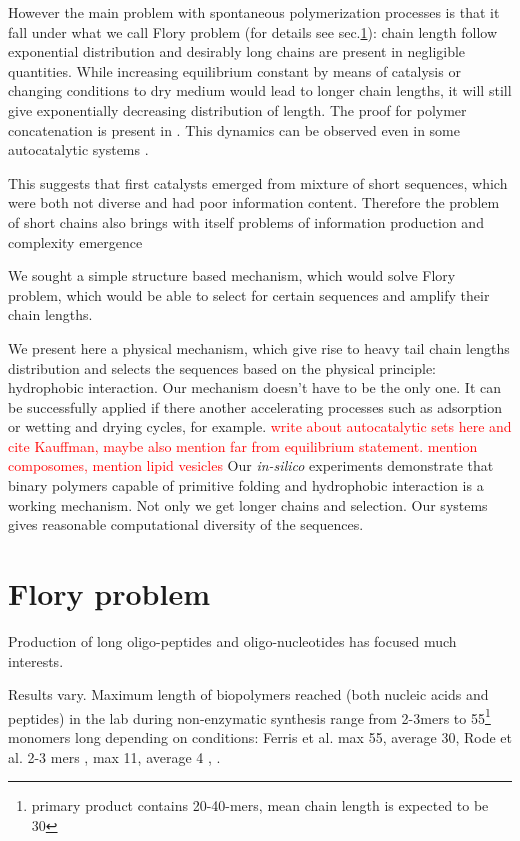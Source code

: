 \documentclass[12pt]{paper}
\newcommand{\red}[1]{\textcolor{red}{#1}}
\begin{document}
However the main problem with spontaneous polymerization processes is that it fall under what we 
call Flory problem (for details see 
sec.\ref{sec:flory}): chain length follow exponential distribution and desirably long chains are 
present in negligible quantities. While increasing equilibrium constant by means of catalysis or 
changing conditions to dry medium would lead to longer chain lengths, it will still give 
exponentially decreasing distribution of length. The proof for polymer concatenation is present 
in \cite{Derr2012}. This dynamics can be observed even in some autocatalytic systems \cite{Wu2009}.

This suggests that first catalysts emerged from mixture of short sequences, which were both 
not diverse and had poor information content. Therefore the problem of short chains also brings 
with itself problems of information production and complexity emergence \cite{Joyce1987,Abel2005}

 We sought a simple structure based mechanism, 
which would solve Flory problem, which would be able to select for certain sequences and 
amplify their chain lengths.

 We present here a physical mechanism, which give rise to 
heavy tail chain lengths distribution and selects the sequences based on the physical principle: 
hydrophobic interaction. Our mechanism doesn't have to be the only one. It can be successfully 
applied if there another accelerating processes such as adsorption or wetting and drying cycles, 
for example.
\red{write about autocatalytic sets here and cite Kauffman, maybe also mention far from 
equilibrium statement. mention composomes, mention lipid vesicles \cite{Luisi1999,Deamer2008}}
Our \textit{in-silico} experiments demonstrate that binary polymers 
capable of primitive folding and hydrophobic interaction is a working mechanism. Not only we get 
longer chains and selection. Our systems gives reasonable computational diversity of the sequences.


   
\section{Flory problem}
\label{sec:flory} Production of long oligo-peptides and oligo-nucleotides 
has focused much interests\cite{Shapiro1984,Ferris1996,Kanavarioti2001,Brack2007,Danger2012}.

Results vary. Maximum length of biopolymers reached (both nucleic acids and peptides) in the lab 
during non-enzymatic synthesis range from 2-3mers to 
55\footnote{primary product contains 20-40-mers, mean chain length is expected to be 
30\cite{Ferris1996}} monomers long depending on conditions: 
Ferris et al. max 55, average 30\cite{Ferris1996}, Rode et al. 2-3 mers
\cite{Rode1999}, max 11, average 4 \cite{Kanavarioti2001}, \cite{Leman2004a}. 
\end{document}
